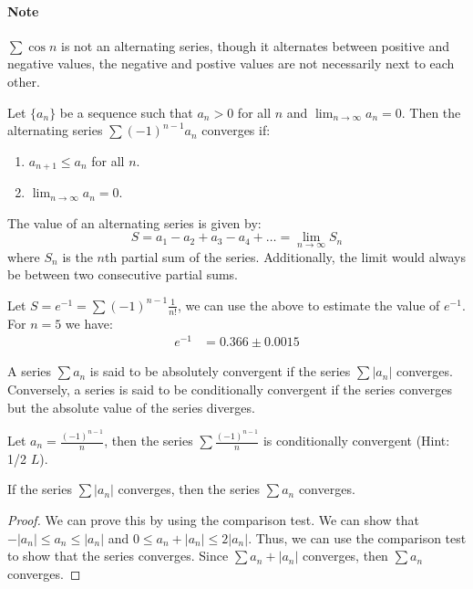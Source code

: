 \documentclass[11pt]{report}
\begin{document}
\paragraph{Note} $\sum \cos n$ is not an alternating series, though it alternates between positive and negative values, the negative and postive values are not necessarily next to each other.
\begin{theorem}
    Let $\{a_n\}$ be a sequence such that $a_n > 0$ for all $n$ and $\lim_{n \to \infty} a_n = 0$. Then the alternating series $\sum (-1)^{n-1} a_n$ converges if:
    \begin{enumerate}
        \item $a_{n+1} \le a_n$ for all $n$.
        \item $\lim_{n \to \infty} a_n = 0$.
    \end{enumerate}
\end{theorem}
\begin{theorem}
    The value of an alternating series is given by:
    \begin{equation}
        S = a_1 - a_2 + a_3 - a_4 + \ldots = \lim_{n \to \infty} S_n
    \end{equation}
    where $S_n$ is the $n$th partial sum of the series. Additionally, the limit would always be between two consecutive partial sums.
\end{theorem}
\begin{example}
    Let $S = e^{-1} = \sum (-1)^{n-1} \frac{1}{n!}$, we can use the above to estimate the value of $e^{-1}$. For $n=5$ we have:
    \begin{align*}
        e^{-1} &= 0.366 \pm 0.0015
    \end{align*}
\end{example}
\begin{definition}
    A series $\sum a_n$ is said to be absolutely convergent if the series $\sum |a_n|$ converges. Conversely, a series is said to be conditionally convergent if the series converges but the absolute value of the series diverges.
\end{definition}
\begin{example}
    Let $a_n = \frac{(-1)^{n-1}}{n}$, then the series $\sum \frac{(-1)^{n-1}}{n}$ is conditionally convergent (Hint: 1/2 $L$).
\end{example}
\begin{theorem}
    If the series $\sum |a_n|$ converges, then the series $\sum a_n$ converges.
\end{theorem}
\begin{proof}
    We can prove this by using the comparison test. We can show that $-|a_n| \le a_n \le |a_n|$ and $0 \le a_n + |a_n| \le 2|a_n|$. Thus, we can use the comparison test to show that the series converges. Since $\sum a_n + |a_n|$ converges, then $\sum a_n$ converges.
\end{proof}
\end{document}
